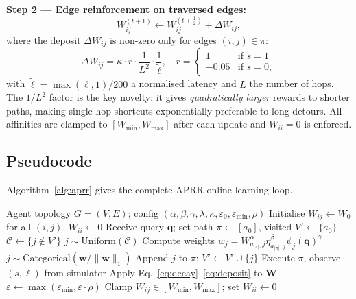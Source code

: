 \documentclass[journal,twocolumn,letterpaper]{IEEEtran}
\newcommand{\APRR}{\textsc{APRR}}
\newcommand{\WW}{\mathbf{W}}
\begin{document}
\medskip
\noindent\textbf{Step 2 — Edge reinforcement on traversed edges:}
\begin{equation}
  W_{ij}^{(t+1)} \leftarrow W_{ij}^{(t+\tfrac{1}{2})} + \Delta W_{ij},
\label{eq:reinforce}
\end{equation}
where the deposit $\Delta W_{ij}$ is non-zero only for edges $(i,j)\in\pi$:
\begin{equation}
  \Delta W_{ij} = \kappa\cdot r \cdot \frac{1}{L^2} \cdot \frac{1}{\tilde{\ell}},
  \quad r = \begin{cases} 1 & \text{if }s=1 \\ -0.05 & \text{if }s=0, \end{cases}
\label{eq:deposit}
\end{equation}
with $\tilde{\ell}=\max(\ell,1)/200$ a normalised latency and $L$ the number
of hops.  The $1/L^2$ factor is the key novelty: it gives \emph{quadratically
larger} rewards to shorter paths, making single-hop shortcuts exponentially
preferable to long detours.  All affinities are clamped to
$[W_{\min},W_{\max}]$ after each update and $W_{ii}=0$ is enforced.

\subsection{Pseudocode}

Algorithm~\ref{alg:aprr} gives the complete \APRR{} online-learning loop.

\begin{algorithm}[t]
\caption{\APRR{} Online Routing}
\label{alg:aprr}
\begin{algorithmic}[1]
\REQUIRE Agent topology $G=(V,E)$; config $(\alpha,\beta,\gamma,\lambda,\kappa,
         \varepsilon_0, \varepsilon_{\min}, \rho)$
\STATE Initialise $W_{ij}\leftarrow W_0$ for all $(i,j)$, $W_{ii}\leftarrow 0$
  \STATE Receive query $\mathbf{q}$; set path $\pi\leftarrow[a_0]$, visited $V'\leftarrow\{a_0\}$
  \REPEAT
    \STATE $\mathcal{C}\leftarrow\{j\notin V'\}$
      \STATE $j\sim\mathrm{Uniform}(\mathcal{C})$
    \ELSE
      \STATE Compute weights $w_j=W_{a_{|\pi|},j}^{\alpha}\eta_{a_{|\pi|},j}^{\beta}\psi_j(\mathbf{q})^{\gamma}$
      \STATE $j\sim \mathrm{Categorical}(\mathbf{w}/\|\mathbf{w}\|_1)$
    \ENDIF
    \STATE Append $j$ to $\pi$; $V'\leftarrow V'\cup\{j\}$
  \STATE Execute $\pi$, observe $(s,\ell)$ from simulator
  \STATE Apply Eq.~\eqref{eq:decay}--\eqref{eq:deposit} to $\WW$
  \STATE $\varepsilon\leftarrow\max(\varepsilon_{\min}, \varepsilon\cdot\rho)$
  \STATE Clamp $W_{ij}\in[W_{\min}, W_{\max}]$; set $W_{ii}\leftarrow 0$
\ENDFOR
\end{algorithmic}
\end{algorithm}
\end{document}
